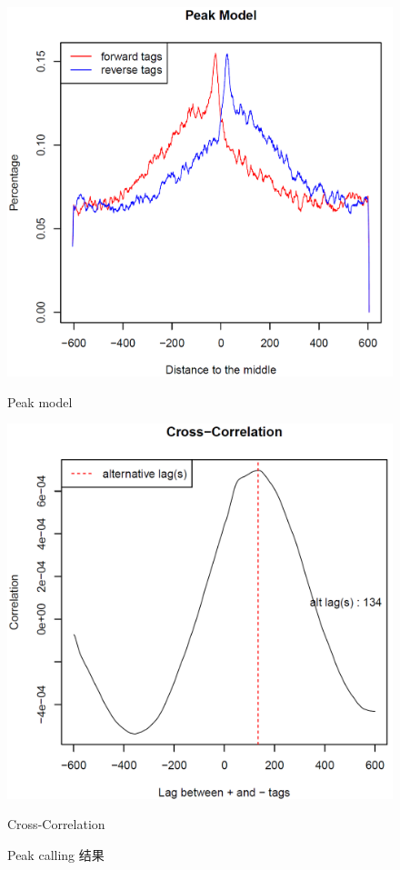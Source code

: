 \documentclass[UTF8]{ctexart}
\begin{document}
\begin{figure}[h]
	\begin{minipage}{0.45\linewidth}
		\centerline{\includegraphics[width=\textwidth]{img/peak_model.png}}
		\centerline{Peak model}
	\end{minipage}
	\begin{minipage}{0.45\linewidth}
		\centerline{\includegraphics[width=\textwidth]{img/cross_correlation.png}}
		\centerline{Cross-Correlation}
\end{minipage}
\caption{Peak calling 结果}
\end{figure}
\end{document}
